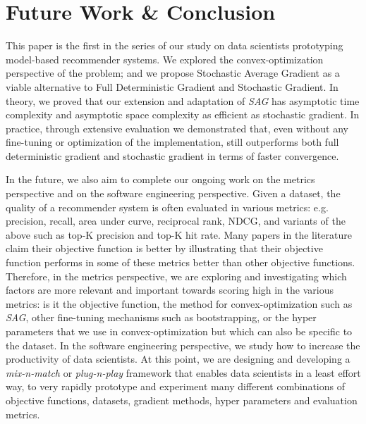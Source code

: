 \section{Future Work \& Conclusion}
This paper is the first in the series of our study on data scientists prototyping model-based recommender systems.  
We explored the convex-optimization perspective of the problem; and we propose Stochastic Average Gradient as a viable alternative to Full Deterministic Gradient and Stochastic Gradient.  
In theory, we proved that our extension and adaptation of \emph{SAG} has asymptotic time complexity and asymptotic space complexity as efficient as stochastic gradient.  
In practice, through extensive evaluation we demonstrated that, even without any fine-tuning or optimization of the implementation, 
\tool still outperforms both full deterministic gradient and stochastic gradient in terms of faster convergence.  

In the future, we also aim to complete our ongoing work on the metrics perspective and on the software engineering perspective.  
Given a dataset, the quality of a recommender system is often evaluated in various metrics: 
e.g. precision, recall, area under curve, reciprocal rank, NDCG, and variants of the above such as top-K precision and top-K hit rate.
Many papers in the literature claim their objective function is better by illustrating that their objective function performs in some of these metrics better than other objective functions.  
Therefore, in the metrics perspective, we are exploring and investigating which factors are more relevant and important towards scoring high in the various metrics: 
is it the objective function, the method for convex-optimization such as \emph{SAG}, other fine-tuning mechanisms such as bootstrapping, 
or the hyper parameters that we use in convex-optimization but which can also be specific to the dataset.  
In the software engineering perspective, we study how to increase the productivity of data scientists.  
At this point, we are designing and developing a \emph{mix-n-match} or \emph{plug-n-play} framework that enables data scientists in a least effort way, 
to very rapidly prototype and experiment many different combinations of objective functions, datasets, gradient methods, hyper parameters and evaluation metrics.  
